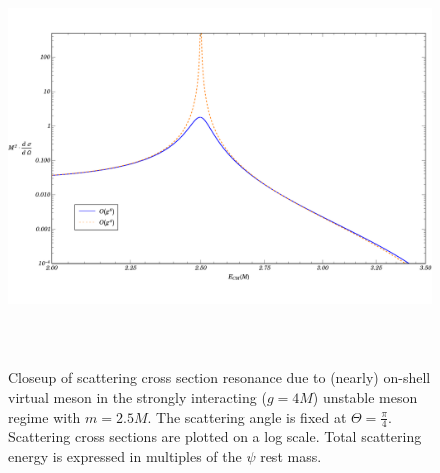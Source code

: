 \documentclass{article}
\begin{document}
\begin{figure}
\begin{center}
\includegraphics[width=15cm, height=11cm]{Resonance-Illustration}
\caption{Closeup of scattering cross section resonance due to (nearly) on-shell virtual meson in the strongly interacting ($g = 4 M$) unstable meson regime with $m = 2.5 M$. The scattering angle is fixed at $\Theta = \frac{\pi}{4}$. Scattering cross sections are plotted on a log scale. Total scattering energy is expressed in multiples of the $\psi$ rest mass.} 
\label{IllResonance}
\end{center}
\end{figure}
\end{document}
